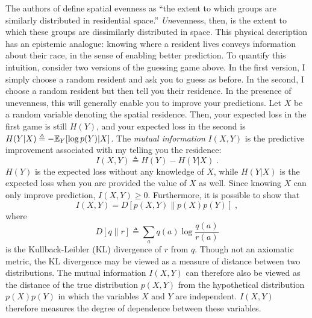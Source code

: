 \documentclass[english]{scrartcl}
\begin{document}
		The authors of \cite{Reardon2004} define spatial evenness as ``the extent to which groups are similarly distributed in residential space.'' \emph{Un}evenness, then, is the extent to which these groups are dissimilarly distributed in space. This physical description has an epistemic analogue: knowing where a resident lives conveys information about their race, in the sense of enabling better prediction. To quantify this intuition, consider two versions of the guessing game above. In the first version, I simply choose a random resident and ask you to guess as before. In the second, I choose a random resident but then tell you their residence. In the presence of unevenness, this will generally enable you to improve your predictions. Let $X$ be a random variable denoting the spatial residence. Then, your expected loss in the first game is still $H(Y)$, and your expected loss in the second is $H(Y|X) \triangleq -\mathbb{E}_{Y}[\log p(Y)|X]$. The \emph{mutual information} $I(X,Y)$ is the predictive improvement associated with my telling you the residence: 
		\begin{equation}
			 I(X,Y) \triangleq H(Y) - H(Y|X)\;.
		\end{equation}
		$H(Y)$ is the expected loss without any knowledge of $X$, while $H(Y|X)$ is the expected loss when you are provided the value of $X$ as well. Since knowing $X$ can only improve prediction, $I(X,Y) \geq 0$. Furthermore, it is possible to show that 
		\begin{equation}
			I(X,Y) = D[p(X,Y)\|p(X)p(Y)]\;,
		\end{equation}
		where 
		\begin{equation}
			D[q\|r] \triangleq \sum_a q(a) \log \frac{q(a)}{r(a)}
		\end{equation}
		is the Kullback-Leibler (KL) divergence of $r$ from $q$. Though not an axiomatic metric, the KL divergence may be viewed as a measure of distance between two distributions. The mutual information $I(X,Y)$ can therefore also be viewed as the distance of the true distribution $p(X,Y)$ from the hypothetical distribution $p(X)p(Y)$ in which the variables $X$ and $Y$ are independent. $I(X,Y)$ therefore measures the degree of dependence between these variables. 
\end{document}
